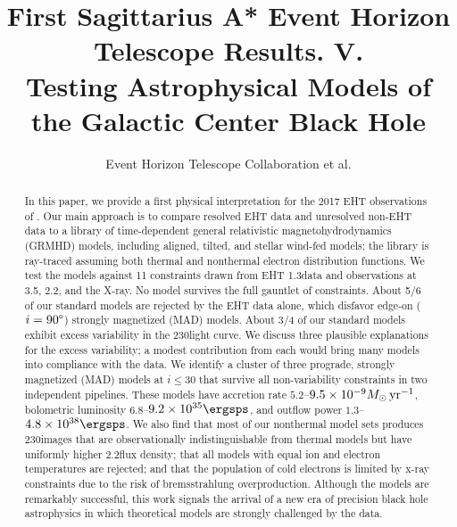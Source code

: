 \documentclass[twocolumn,twocolappendix,tighten,dvipsnames,linenumbers]{aastex63}
\begin{document}
\title{First Sagittarius A* Event Horizon Telescope Results. V.\\
  Testing Astrophysical Models of the Galactic Center Black Hole}

%
\author{Event Horizon Telescope Collaboration et al.}


\received{\today}
\revised{\today}

\begin{abstract}

  In this paper, we provide a first physical interpretation for the 2017 EHT observations of \sgra.  Our main approach is to compare resolved EHT data and unresolved non-EHT data to a library of time-dependent general relativistic magnetohydrodynamics (GRMHD) models, including aligned, tilted, and stellar wind-fed models; the library is ray-traced assuming both thermal and nonthermal electron distribution functions. We test the models against 11 constraints drawn from EHT 1.3\mm data and observations at 3.5\mm, 2.2\um, and the X-ray.  No model survives the full gauntlet of constraints. About 5/6 of our standard models are rejected by the EHT data alone, which disfavor edge-on ($i = 90\degree$) strongly magnetized (MAD) models.  About 3/4 of our standard models exhibit excess variability in the 230\GHz light curve.  We discuss three plausible explanations for the excess variability; a modest contribution from each would bring many models into compliance with the data.  We identify a cluster of three prograde, strongly magnetized (MAD) models at $i \le 30$ that survive all non-variability constraints in two independent pipelines.  These models have accretion rate $5.2$--$9.5\times10^{-9}M_\odot\,\mathrm{yr}^{-1}$, bolometric luminosity $6.8$--$9.2\times10^{35}\ergsps$, and outflow power $1.3$--$4.8\times10^{38}\ergsps$.  We also find that most of our nonthermal model sets produces 230\GHz images that are observationally indistinguishable from thermal models but have uniformly higher 2.2\um flux density; that all models with equal ion and electron temperatures are rejected; and that the population of cold electrons is limited by x-ray constraints due to the risk of bremsstrahlung overproduction.  Although the models are remarkably successful, this work signals the arrival of a new era of precision black hole astrophysics in which theoretical models are strongly challenged by the data.
  
\end{abstract}
\end{document}
